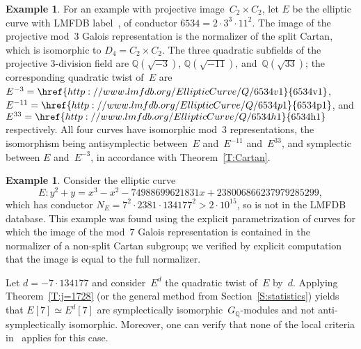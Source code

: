 \documentclass[12pt, reqno]{amsart}
\newcommand{\lmfdbec}[3]{\href{http://www.lmfdb.org/EllipticCurve/Q/#1#2#3}{{\text{\rm#1#2#3}}}}
\newcommand{\Q}{\mathbb{Q}}
\newcommand{\vv}{\upsilon}
\numberwithin{equation}{section}
\theoremstyle{definition}
\newtheorem{example}[theorem]{Example}
\theoremstyle{remark}
\begin{document}
\begin{example} \label{Ex:3twists}
  For an example with projective image~$C_2\times C_2$, let $E$ be the
  elliptic curve with LMFDB label~\lmfdbec{6534}{a}{1}, of conductor
  $6534=2\cdot3^3\cdot11^2$.  The image of the projective mod~$3$
  Galois representation is the normalizer of the split Cartan, which
  is isomorphic to $D_4 = C_2\times C_2$.  The three quadratic
  subfields of the projective $3$-division field are $\Q(\sqrt{-3})$,
  $\Q(\sqrt{-11})$, and~$\Q(\sqrt{33})$; the corresponding quadratic
  twist of~$E$ are $E^{-3}=\lmfdbec{6534}{v}{1}$,
  $E^{-11}=\lmfdbec{6534}{p}{1}$, and $E^{33}=\lmfdbec{6534}{h}{1}$
  respectively.  All four curves have isomorphic mod~$3$
  representations, the isomorphism being antisymplectic between~$E$
  and~$E^{-11}$ and~$E^{33}$, and symplectic between $E$ and~$E^{-3}$,
  in accordance with Theorem~\ref{T:Cartan}.

\begin{comment}
  \textbf{We no longer need the following, since the new version of
    Theorem~\ref{T:Cartan} says that the symplectic twist is the one
    by $3^*=-3$!}
  
  The conclusion on the symplectic types follows from part 2) of Theorem~\ref{T:Cartan} once we show
  that $E[3]$ and $E^{-3}[3]$ are symplectically isomorphic. We will show this by applying \cite[Theorem~5]{FKSym} with $\ell = 11$. We use the notation of {\it loc. cit.}. Write $E' = E^{-3}$. The curves $E/\Q_{11}$ and $E'/\Q_{11}$ have minimal models satisfying
  \[
  \vv_{11}(\Delta_m) = \vv_{11}(\Delta_m') = 3 \quad \text{ and } \quad \tilde{\Delta} = -1259712, \quad \tilde{\Delta}' = -1728.
  \]
 Thus $e = e' = 4$ by \cite[Proposition~1]{Kraus1990}. 
Moreover, we have $\vv_{11}(\Delta_m) \equiv \vv_{11}(\Delta_m')
\pmod{4}$ and none of $\tilde{\Delta}$, $\tilde{\Delta}'$ is a square mod~$11$. Thus, $r=t=0$ and $E[3]$ and $E'[3]$ are symplectically isomorphic $G_{\Q_{11}}$-modules, hence $E[3]$ and $E'[3]$ are also symplectically isomorphic $G_\Q$-modules.
\end{comment}
\end{example}

\begin{example} \label{Ex:LocalFail7}
Consider the elliptic curve
\[ E : y^2 + y = x^3 - x^2 - 74988699621831x +  238006866237979285299, \]
which has conductor $ N_E = 7^2 \cdot 2381 \cdot
134177^2>2\cdot10^{15}$, so is not in the LMFDB database.  This
example was found using the explicit parametrization of curves for
which the image of the mod~$7$ Galois representation is contained in
the normalizer of a non-split Cartan subgroup; we verified by explicit
computation that the image is equal to the full normalizer.

Let $d = -7 \cdot 134177$ and consider~$E^d$ the quadratic twist
of~$E$ by~$d$. Applying Theorem~\ref{T:j=1728} (or the general method
from Section~\ref{S:statistics}) yields that $E[7] \simeq E^d[7]$ are
symplectically isomorphic~$G_\Q$-modules and not anti-symplectically
isomorphic. Moreover, one can verify that none of the local criteria
in~\cite{FKSym} applies for this case.
\end{example}
\end{document}
